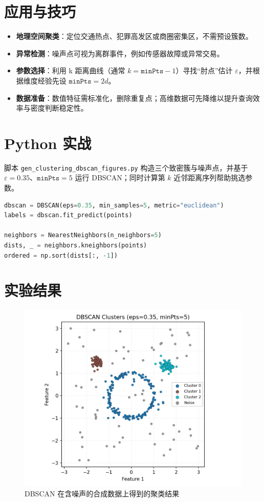 \documentclass[UTF8,zihao=-4]{ctexart}
\begin{document}
\section{应用与技巧}
\begin{itemize}
  \item \textbf{地理空间聚类}：定位交通热点、犯罪高发区或商圈密集区，不需预设簇数。
  \item \textbf{异常检测}：噪声点可视为离群事件，例如传感器故障或异常交易。
  \item \textbf{参数选择}：利用 k 距离曲线（通常 \(k = \texttt{minPts}-1\)）寻找“肘点”估计 \(\varepsilon\)，并根据维度经验先设 \(\texttt{minPts} = 2d\)。
  \item \textbf{数据准备}：数值特征需标准化，删除重复点；高维数据可先降维以提升查询效率与密度判断稳定性。
\end{itemize}

\section{Python 实战}
脚本 \texttt{gen\_clustering\_dbscan\_figures.py} 构造三个致密簇与噪声点，并基于 \(\varepsilon=0.35\)、\(\texttt{minPts}=5\) 运行 DBSCAN；同时计算第 \(k\) 近邻距离序列帮助挑选参数。
\begin{lstlisting}[language=Python,caption={脚本 gen_clustering_dbscan_figures.py 片段}]
dbscan = DBSCAN(eps=0.35, min_samples=5, metric="euclidean")
labels = dbscan.fit_predict(points)

neighbors = NearestNeighbors(n_neighbors=5)
dists, _ = neighbors.kneighbors(points)
ordered = np.sort(dists[:, -1])
\end{lstlisting}

\section{实验结果}
\begin{figure}[H]
  \centering
  \includegraphics[width=0.82\linewidth]{dbscan_clusters.png}
  \caption{DBSCAN 在含噪声的合成数据上得到的聚类结果}
  \label{fig:dbscan_clusters_cn}
\end{figure}
\end{document}
